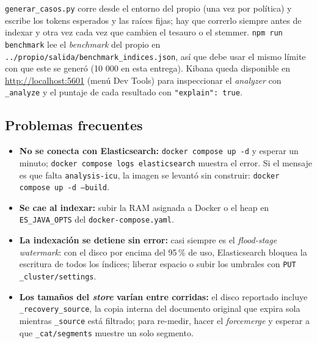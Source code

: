 \documentclass[11pt,spanish]{article}
\begin{document}
\texttt{generar\_casos.py} corre desde el entorno del propio (una vez por política) y escribe los tokens esperados y las raíces fijas; hay que correrlo siempre antes de indexar y otra vez cada vez que cambien el tesauro o el stemmer. \texttt{npm run benchmark} lee el \emph{benchmark} del propio en \texttt{../propio/salida/benchmark\_indices.json}, así que debe usar el mismo límite con que este se generó (10 000 en esta entrega). Kibana queda disponible en \url{http://localhost:5601} (menú Dev Tools) para inspeccionar el \emph{analyzer} con \texttt{\_analyze} y el puntaje de cada resultado con \texttt{"explain": true}.

\subsection{Problemas frecuentes}

\begin{itemize}
  \item \textbf{No se conecta con Elasticsearch:} \texttt{docker compose up -d} y esperar un minuto; \texttt{docker compose logs elasticsearch} muestra el error. Si el mensaje es que falta \texttt{analysis-icu}, la imagen se levantó sin construir: \texttt{docker compose up -d --build}.
  \item \textbf{Se cae al indexar:} subir la RAM asignada a Docker o el heap en \texttt{ES\_JAVA\_OPTS} del \texttt{docker-compose.yaml}.
  \item \textbf{La indexación se detiene sin error:} casi siempre es el \emph{flood-stage watermark}: con el disco por encima del 95\,\% de uso, Elasticsearch bloquea la escritura de todos los índices; liberar espacio o subir los umbrales con \texttt{PUT \_cluster/settings}.
  \item \textbf{Los tamaños del \emph{store} varían entre corridas:} el disco reportado incluye \texttt{\_recovery\_source}, la copia interna del documento original que expira sola mientras \texttt{\_source} está filtrado; para re-medir, hacer el \emph{forcemerge} y esperar a que \texttt{\_cat/segments} muestre un solo segmento.
\end{itemize}
\end{document}
